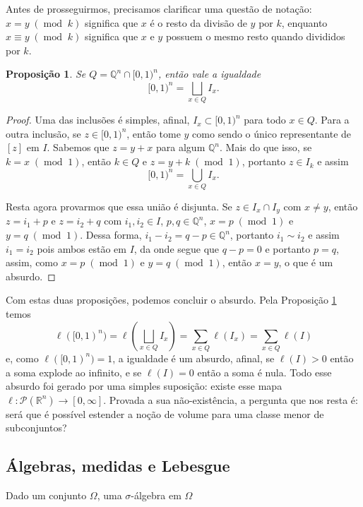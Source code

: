 \documentclass{article}
\newtheorem{proposition}[definition]{Proposição}
\DeclareMathOperator{\ArithmeticMod}{mod}
\newcommand{\modulus}[1]{\phantom{.}(\ArithmeticMod\phantom{.}#1)}
\begin{document}
Antes de prosseguirmos, precisamos clarificar uma questão de notação: $x = y \modulus{k}$ significa que $x$ é o resto da divisão de $y$ por $k$, enquanto $x \equiv y \modulus{k}$ significa que $x$ e $y$ possuem o mesmo resto quando divididos por $k$.

\begin{proposition}\label{prop3}
    Se $Q = \mathbb{Q}^n \cap [0,1)^n$, então vale a igualdade $$[0,1)^n = \bigsqcup_{x \in Q} I_x.$$
\end{proposition}
\begin{proof}
    Uma das inclusões é simples, afinal, $I_x \subset [0,1)^n$ para todo $x \in Q$. Para a outra inclusão, se $z \in [0,1)^n$, então tome $y$ como sendo o único representante de $[z]$ em $I$. Sabemos que $z = y + x$ para algum $\mathbb{Q}^n$. Mais do que isso, se $k = x \modulus{1}$, então $k \in Q$ e $z = y + k \modulus{1}$, portanto $z \in I_k$ e assim $$[0,1)^n = \bigcup_{x \in Q} I_x.$$
    
    Resta agora provarmos que essa união é disjunta. Se $z \in I_x \cap I_y$ com $x \neq y$, então $z = i_1 + p$ e $z = i_2 + q$ com $i_1, i_2 \in I$, $p, q \in \mathbb{Q}^n$, $x = p \modulus{1}$ e $y = q \modulus{1}$. Dessa forma, $i_1 - i_2 = q - p \in \mathbb{Q}^n$, portanto $i_1 \sim i_2$ e assim $i_1 = i_2$ pois ambos estão em $I$, da onde segue que $q - p = 0$ e portanto $p = q$, assim, como $x = p \modulus{1}$ e $y = q \modulus{1}$, então $x = y$, o que é um absurdo.
\end{proof}

Com estas duas proposições, podemos concluir o absurdo. Pela Proposição \ref{prop3} temos $$\ell([0,1)^n) = \ell\left(\bigsqcup_{x \in Q} I_x\right) = \sum_{x \in Q} \ell(I_x) = \sum_{x \in Q} \ell(I)$$ e, como $\ell([0,1)^n) = 1$, a igualdade é um absurdo, afinal, se $\ell(I) > 0$ então a soma explode ao infinito, e se $\ell(I) = 0$ então a soma é nula. Todo esse absurdo foi gerado por uma simples suposição: existe esse mapa $\ell \colon \mathcal{P}(\mathbb{R}^n) \to [0, \infty]$. Provada a sua não-existência, a pergunta que nos resta é: será que é possível estender a noção de volume para uma classe menor de subconjuntos?

\subsection{Álgebras, medidas e Lebesgue}

Dado um conjunto $\Omega$, uma $\sigma$-álgebra em $\Omega$

\nocite{*}
\printbibliography
\end{document}
